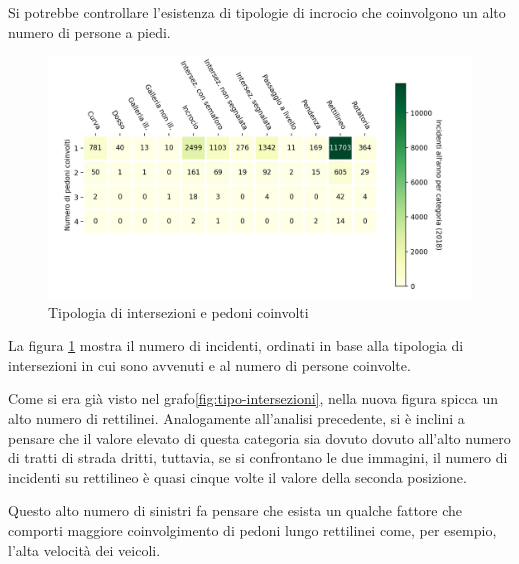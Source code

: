 \documentclass[a4paper,12pt]{report}
\begin{document}
Si potrebbe controllare l'esistenza di tipologie di incrocio che 
coinvolgono un alto numero di persone a piedi. 

\begin{figure}
    \includegraphics[width=\linewidth]{../src/incidenti/incidenti_senza_coords/pedoni/pedoni_incroci.png}
    \caption{Tipologia di intersezioni e pedoni coinvolti}
    \label{fig:pedoni-intersezioni}
\end{figure}

La figura \ref{fig:pedoni-intersezioni} mostra il numero di incidenti, 
ordinati in base alla tipologia di intersezioni in cui sono avvenuti 
e al numero di persone coinvolte.

Come si era già visto nel grafo\ref{fig:tipo-intersezioni}, nella nuova 
figura spicca un alto numero di rettilinei. 
Analogamente all'analisi precedente, si è inclini a pensare che il valore 
elevato di questa categoria sia dovuto dovuto all'alto 
numero di tratti di strada dritti, tuttavia, se si confrontano le due immagini, 
il numero di incidenti su rettilineo è quasi cinque 
volte il valore della seconda posizione.

Questo alto numero di sinistri fa pensare che esista un qualche fattore 
che comporti maggiore coinvolgimento di pedoni lungo rettilinei come, per 
esempio, l'alta velocità dei veicoli.
\end{document}
